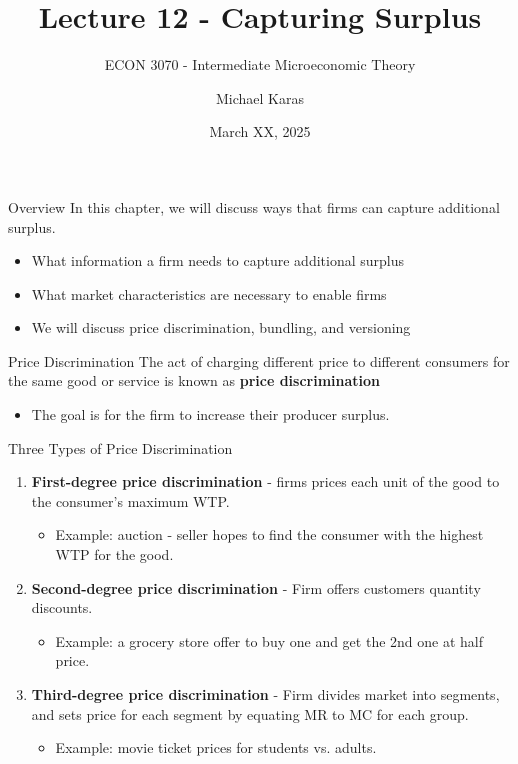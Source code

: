 \documentclass[11pt,t]{beamer}
\author{Michael Karas}
\title{Lecture 12 - Capturing Surplus}
\subtitle{ECON 3070 - Intermediate Microeconomic Theory}
\date{March XX, 2025}
\begin{document}
\begin{frame}
  \titlepage
\end{frame}

\begin{frame}{Overview}
  In this chapter, we will discuss ways that firms can capture additional surplus.

  \begin{itemize}
    \item What information a firm needs to capture additional surplus
    \item What market characteristics are necessary to enable firms
    \item We will discuss price discrimination, bundling, and versioning
  \end{itemize}
\end{frame}

\begin{frame}{Price Discrimination}
  The act of charging different price to different consumers for the same good or service is known as \textbf{price discrimination}

  \begin{itemize}
    \item The goal is for the firm to increase their producer surplus.
  \end{itemize}
\end{frame}

\begin{frame}{Three Types of Price Discrimination}
  \begin{enumerate}
    \item \textbf{First-degree price discrimination} - firms prices each unit of the good to the consumer's maximum WTP.
    \begin{itemize}
      \item Example: auction - seller hopes to find the consumer with the highest WTP for the good.
    \end{itemize}
    
    \item \textbf{Second-degree price discrimination} - Firm offers customers quantity discounts.
    
    \begin{itemize}
      \item Example: a grocery store offer to buy one and get the 2nd one at half price.
    \end{itemize}
    
    \item \textbf{Third-degree price discrimination} - Firm divides market into segments, and sets price for each segment by equating MR to MC for each group.
    
    \begin{itemize}
      \item Example: movie ticket prices for students vs. adults.
    \end{itemize}
  \end{enumerate}
\end{frame}
\end{document}
